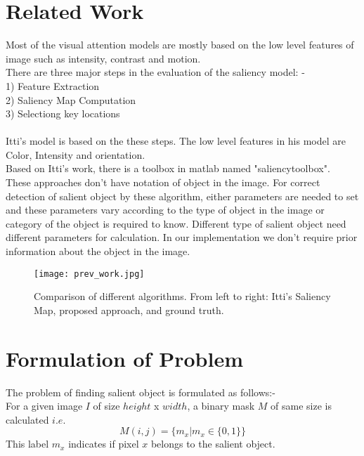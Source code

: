 \documentclass[11pt]{report}
\begin{document}
\section*{Related Work}

Most of the visual attention models are mostly based on the low level features of image such as intensity, contrast and motion.\\
There are three major steps in the evaluation of the saliency model: - \\
1) Feature Extraction \\
2) Saliency Map Computation\\
3) Selectiong key locations\\
\\
Itti's model is based on the these steps. The low level features in his model are  Color, Intensity and orientation.\\
Based on Itti's work, there is a toolbox in matlab named "saliencytoolbox".\\
These approaches don't have notation of object in the image. For correct detection of
salient object by these algorithm, either parameters are needed to set and these parameters
 vary according to the type of object in the image or category of the object is required to know. Different type of salient object need different parameters for calculation. In our
implementation we don't require prior information about the object in the image.\\

\begin{figure}
\center \texttt{[image: prev\_work.jpg]}
\caption{Comparison of different algorithms. From left to right: Itti's Saliency Map,
proposed approach, and ground truth.}
\end{figure} 

\section*{Formulation of Problem}
The problem of finding salient object is formulated as follows:- \\
For a given image $I$ of size $height$ x $width$, a binary mask $M$ of same size is calculated $i.e.$\\
\begin{equation}
M(i, j) = \{m_x  | m_x \in \{0, 1\}  \}
\end{equation}
This label $m_x $ indicates if pixel $x$ belongs to the salient object.
\end{document}
